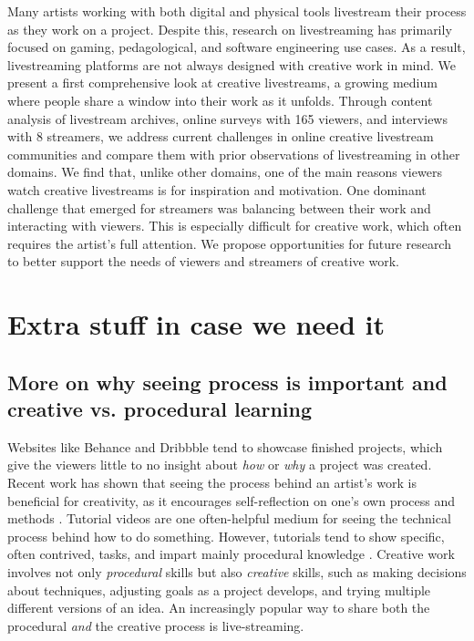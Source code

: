 Many artists working with both digital and physical tools livestream their process as they work on a project. Despite this, research on livestreaming has primarily focused on gaming, pedagological, and software engineering use cases. As a result, livestreaming platforms are not always designed with creative work in mind. We present a first comprehensive look at creative livestreams, a growing medium where people share a window into their work as it unfolds. Through content analysis of livestream archives, online surveys with 165 viewers, and interviews with 8 streamers, we address current challenges in online creative livestream communities and compare them with prior observations of livestreaming in other domains. We find that, unlike other domains, one of the main reasons viewers watch creative livestreams is for inspiration and motivation. One dominant challenge that emerged for streamers was balancing between their work and interacting with viewers. This is especially difficult for creative work, which often requires the artist's full attention. We propose opportunities for future research to better support the needs of viewers and streamers of creative work.


\section{Extra stuff in case we need it}
\subsection{More on why seeing process is important and creative vs. procedural learning}
Websites like Behance and Dribbble tend to showcase finished projects, which give the viewers little to no insight about \textit{how} or \textit{why} a project was created. Recent work has shown that seeing the process behind an artist's work is beneficial for creativity, as it encourages self-reflection on one's own process and methods \cite{Kim2017}. Tutorial videos are one often-helpful medium for seeing the technical process behind how to do something. However, tutorials tend to show specific, often contrived, tasks, and impart mainly procedural knowledge \cite{Torrey2007}. Creative work involves not only \textit{procedural} skills but also \textit{creative} skills, such as making decisions about techniques, adjusting goals as a project develops, and trying multiple different versions of an idea. An increasingly popular way to share both the procedural \textit{and} the creative process is live-streaming. 

